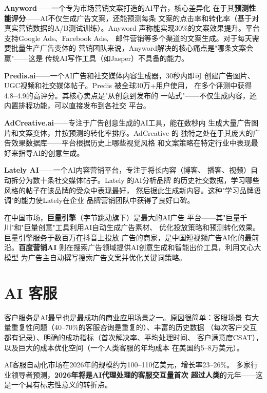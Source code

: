 \textbf{Anyword}——一个专为市场营销文案打造的AI平台，核心差异化
在于其\textbf{预测性能评分}——AI不仅生成广告文案，还能预测每条
文案的点击率和转化率（基于对真实营销数据的A/B测试训练）。Anyword
声称能实现30\%的文案效果提升。平台支持Google Ads、Facebook Ads、
邮件营销等多个渠道的文案生成。对于每天需要批量生产广告变体的
营销团队来说，Anyword解决的核心痛点是"哪条文案会赢"——这是
传统AI写作工具（如Jasper）不具备的能力。

\textbf{Predis.ai}——一个AI广告和社交媒体内容生成器，30秒内即可
创建广告图片、UGC视频和社交媒体帖子。Predis 被全球30万+用户使用，
在多个评测中获得4.8--4.9的高评分。其核心卖点是"从创意到发布的
一站式"——不仅生成内容，还内置排程功能，可以直接发布到各社交
平台。

\textbf{AdCreative.ai}——专注于广告创意生成的AI工具，能在数秒内
生成大量广告图片和文案变体，并按预测的转化率排序。AdCreative 的
独特之处在于其庞大的广告效果数据库——平台根据历史上哪些视觉风格
和文案策略在特定行业中表现最好来指导AI的创意生成。

\textbf{Lately AI}——一个AI内容营销平台，专注于将长内容（博客、
播客、视频）自动拆分为数十条社交媒体帖子。Lately 的AI分析品牌
的历史社交数据，学习哪些风格的帖子在该品牌的受众中表现最好，
然后据此生成新内容。这种"学习品牌语调"的能力使Lately在企业
品牌营销团队中获得了良好口碑。

在中国市场，\textbf{巨量引擎}（字节跳动旗下）是最大的AI广告
平台——其"巨量千川"和"巨量创意"工具利用AI自动生成广告素材、
优化投放策略和预测转化效果。巨量引擎服务于数百万在抖音上投放
广告的商家，是中国短视频广告AI化的最前沿。\textbf{百度营销AI}
则在搜索广告领域提供AI创意生成和智能出价工具，利用文心大模型
为广告主自动撰写搜索广告文案并优化关键词策略。


\section{AI 客服}
\label{sec:social-customer-service}

客户服务是AI最早也是最成功的商业应用场景之一。原因很简单：客服场景
有大量重复性问题（40--70\%的客服咨询是重复的）、丰富的历史数据
（每次客户交互都有记录）、明确的成功指标（首次解决率、平均处理时间、
客户满意度CSAT），以及巨大的成本优化空间（一个人类客服的年均成本
在美国约5--8万美元）。

AI客服自动化市场在2026年的规模约为100--110亿美元，增长率23--26\%。
多家行业领导者预测，\textbf{2026年将是AI代理处理的客服交互量首次
超过人类}的元年——这是一个具有标志性意义的转折点。

